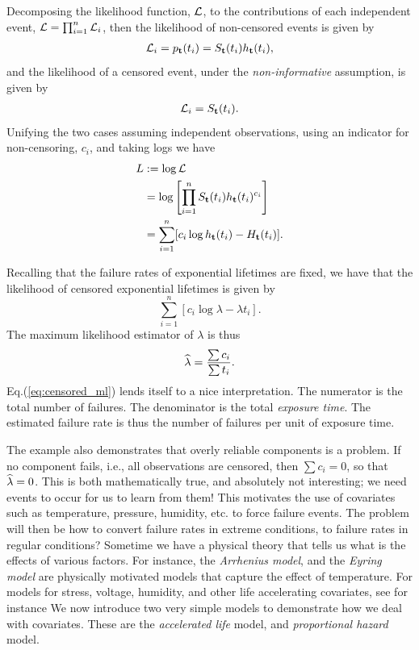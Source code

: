 Decomposing the likelihood function, $\mathcal{L}$, to the contributions of each independent event, $\mathcal{L}=\prod_{i=1}^n \mathcal{L}_i$, then the likelihood of non-censored events is given by
\begin{align}
	\mathcal{L}_i=p_{\mathbf{t}}(t_i)= S_{\mathbf{t}} (t_i) h_{\mathbf{t}} (t_i),
\end{align}
and the likelihood of a censored event, under the \emph{non-informative} assumption, is given by 
\begin{align}
	\mathcal{L}_i=S_{\mathbf{t}} (t_i) .
\end{align}
Unifying the two cases assuming independent observations, using an indicator for non-censoring, $c_i$, and taking logs we have
\begin{align}
	L &:=\log \mathcal{L}\\ 
	&= \log \left[\prod_{i=1}^{n} S_{\mathbf{t}} (t_i) h_{\mathbf{t}} (t_i)^{c_i}\right] \\
	&= \sum_{i=1}^{n} [c_i \log h_{\mathbf{t}} (t_i) - H_{\mathbf{t}} (t_i)]. \label{eq:censored_likelihood}
\end{align}


\begin{example}
\label{ex:censoring}
Recalling that the failure rates of exponential lifetimes are fixed, we have that the likelihood of censored exponential lifetimes is given by 
$$
	\sum_{i=1}^{n} [c_i \log \lambda - \lambda t_i].
$$
The maximum likelihood estimator of $\lambda$ is thus
\begin{align}
	\widehat{\lambda}= \frac{\sum c_i}{\sum t_i}. \label{eq:censored_ml}
\end{align}
Eq.(\ref{eq:censored_ml}) lends itself to a nice interpretation.
The numerator is the total number of failures.
The denominator is the total \emph{exposure time}. 
The estimated failure rate is thus the number of failures per unit of exposure time. 
\end{example}

The example also demonstrates that overly reliable components is a problem. 
If no component fails, i.e., all observations are censored, then $\sum c_i=0$, so that $\widehat{\lambda}=0$. 
This is both mathematically true, and absolutely not interesting; we need events to occur for us to learn from them!
This motivates the use of covariates such as temperature, pressure, humidity, etc. to force failure events. 
The problem will then be how to convert failure rates in extreme conditions, to failure rates in regular conditions?
Sometime we have a physical theory that tells us what is the effects of various factors.
For instance, the \emph{Arrhenius model}, and the \emph{Eyring model} are physically motivated models that capture the effect of temperature.
For models for stress, voltage, humidity, and other life accelerating covariates, see for instance \cite[Sec.8.1.5]{natrella_nist/sematech_2010}
We now introduce two very simple models to demonstrate how we deal with covariates. 
These are the \emph{accelerated life} model, and \emph{proportional hazard} model. 



